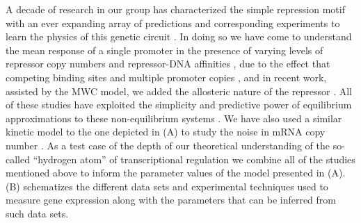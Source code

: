 A decade of research in our group has characterized the simple repression motif
with an ever expanding array of predictions and corresponding experiments to
learn the physics of this genetic circuit . In doing so
we have come to understand the mean response of a single promoter in the
presence of varying levels of repressor copy numbers and repressor-DNA
affinities \cite{Garcia2011c}, due to the effect that competing binding sites
and multiple promoter copies \cite{Brewster2014}, and in recent work, assisted
by the MWC model, we added the allosteric nature of the repressor
\cite{Razo-Mejia2018}. All of these studies have exploited the simplicity and
predictive power of equilibrium approximations to these non-equilibrium systems
\cite{Buchler2003}. We have also used a similar kinetic model to the one
depicted in (A) to study the noise in mRNA copy number
\cite{Jones2014a}. As a test case of the depth of our theoretical understanding
of the so-called ``hydrogen atom'' of transcriptional regulation we combine all
of the studies mentioned above to inform the parameter values of the model
presented in (A). (B)
schematizes the different data sets and experimental techniques used to measure
gene expression along with the parameters that can be inferred from such data
sets.

